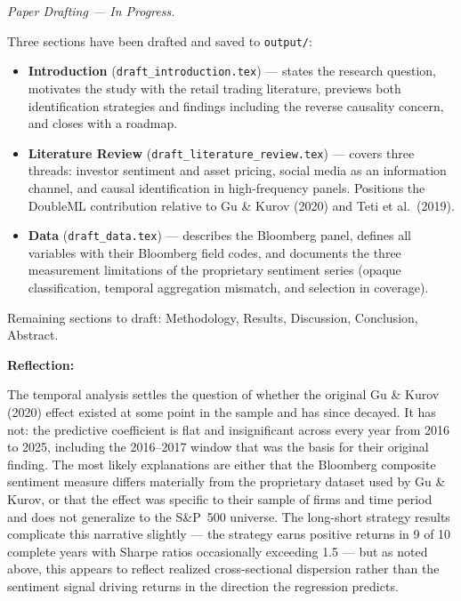 \documentclass[12pt]{article}
\begin{document}
\medskip

\noindent\textit{Paper Drafting --- In Progress.}

Three sections have been drafted and saved to \texttt{output/}:
\begin{itemize}
    \item \textbf{Introduction} (\texttt{draft\_introduction.tex}) --- states the research question,
    motivates the study with the retail trading literature, previews both identification strategies
    and findings including the reverse causality concern, and closes with a roadmap.
    \item \textbf{Literature Review} (\texttt{draft\_literature\_review.tex}) --- covers three threads:
    investor sentiment and asset pricing, social media as an information channel, and causal
    identification in high-frequency panels. Positions the DoubleML contribution relative to Gu \&
    Kurov (2020) and Teti et al.\ (2019).
    \item \textbf{Data} (\texttt{draft\_data.tex}) --- describes the Bloomberg panel, defines all
    variables with their Bloomberg field codes, and documents the three measurement limitations of
    the proprietary sentiment series (opaque classification, temporal aggregation mismatch, and
    selection in coverage).
\end{itemize}
Remaining sections to draft: Methodology, Results, Discussion, Conclusion, Abstract.

\bigskip

\noindent\textbf{Reflection:}

The temporal analysis settles the question of whether the original Gu \& Kurov (2020) effect
existed at some point in the sample and has since decayed. It has not: the predictive coefficient
is flat and insignificant across every year from 2016 to 2025, including the 2016--2017 window
that was the basis for their original finding. The most likely explanations are either that the
Bloomberg composite sentiment measure differs materially from the proprietary dataset used by Gu
\& Kurov, or that the effect was specific to their sample of firms and time period and does not
generalize to the S\&P~500 universe. The long-short strategy results complicate this narrative
slightly --- the strategy earns positive returns in 9 of 10 complete years with Sharpe ratios
occasionally exceeding 1.5 --- but as noted above, this appears to reflect realized cross-sectional
dispersion rather than the sentiment signal driving returns in the direction the regression
predicts.
\end{document}
